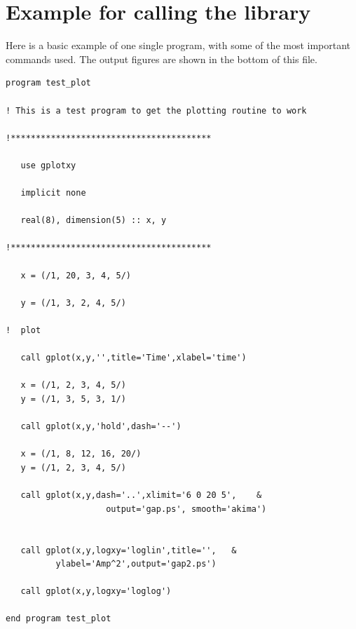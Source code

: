 \documentclass{article}
\begin{document}
\section{Example for calling the library}
Here is a basic example of one single program, with some of the most important commands used. The output figures are shown in the bottom of this file. 
\begin{verbatim}
program test_plot

! This is a test program to get the plotting routine to work

!****************************************

   use gplotxy

   implicit none

   real(8), dimension(5) :: x, y

!****************************************

   x = (/1, 20, 3, 4, 5/)

   y = (/1, 3, 2, 4, 5/)

!  plot

   call gplot(x,y,'',title='Time',xlabel='time')
   
   x = (/1, 2, 3, 4, 5/)
   y = (/1, 3, 5, 3, 1/)

   call gplot(x,y,'hold',dash='--')

   x = (/1, 8, 12, 16, 20/)
   y = (/1, 2, 3, 4, 5/)

   call gplot(x,y,dash='..',xlimit='6 0 20 5',    & 
                    output='gap.ps', smooth='akima')
   
   
   call gplot(x,y,logxy='loglin',title='',   &
   	      ylabel='Amp^2',output='gap2.ps')

   call gplot(x,y,logxy='loglog')

end program test_plot
\end{verbatim}
\end{document}
